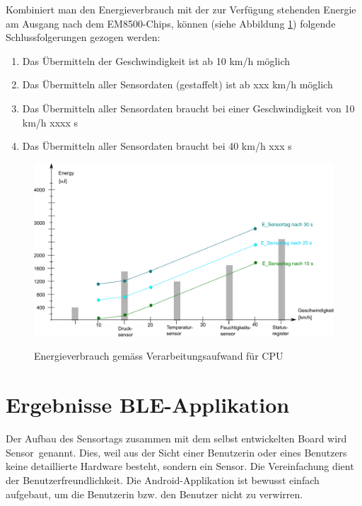 Kombiniert man den Energieverbrauch mit der zur Verfügung stehenden Energie am Ausgang nach dem EM8500-Chips, können (siehe Abbildung \ref{resultat_Zsm_Energy}) folgende Schlussfolgerungen gezogen werden:

\begin{enumerate}
    \item Das Übermitteln der Geschwindigkeit ist ab 10 km/h möglich
    \item Das Übermitteln aller Sensordaten (gestaffelt) ist ab xxx km/h möglich
    \item Das Übermitteln aller Sensordaten braucht bei einer Geschwindigkeit von 10 km/h xxxx s
    \item Das Übermitteln aller Sensordaten braucht bei 40 km/h xxx s
\end{enumerate}

\begin{figure}[ht]
\includegraphics[width=1\textwidth]{4Resultate/imag/EnergyVerbrauchZusammenfassung.png}\label{resultat_Zsm_Energy} 
\caption{Energieverbrauch gem\"{a}ss Verarbeitungsaufwand für CPU}
\end{figure}






\newpage
\section{Ergebnisse BLE-Applikation}

Der Aufbau des Sensortags zusammen mit dem selbst entwickelten Board wird \glqq Sensor\grqq\thinspace\ genannt. Dies, weil aus der Sicht einer Benutzerin oder eines Benutzers keine detaillierte Hardware besteht, sondern \glqq ein Sensor\grqq. Die Vereinfachung dient der Benutzerfreundlichkeit. Die Android-Applikation ist bewusst einfach aufgebaut, um die Benutzerin bzw. den Benutzer nicht zu verwirren. 


